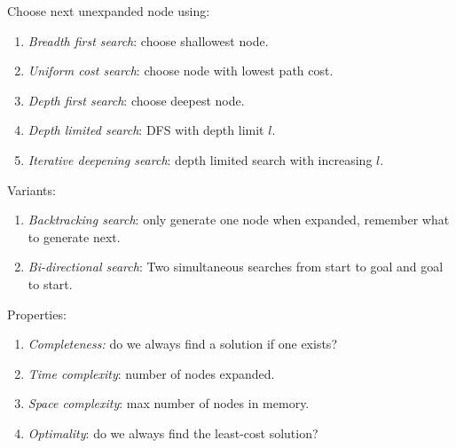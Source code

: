\documentclass[twocolumn,english]{article}
\begin{document}
Choose next unexpanded node using:
\begin{enumerate}
\item \emph{Breadth first search}: choose shallowest node.
\item \emph{Uniform cost search}: choose node with lowest path cost.
\item \emph{Depth first search}: choose deepest node.
\item \emph{Depth limited search}: DFS with depth limit $l$.
\item \emph{Iterative deepening search}: depth limited search with increasing
$l$.
\end{enumerate}
Variants:
\begin{enumerate}
\item \emph{Backtracking search}: only generate one node when expanded,
remember what to generate next.
\item \emph{Bi-directional search}: Two simultaneous searches from start
to goal and goal to start.
\end{enumerate}
Properties:
\begin{enumerate}
\item \emph{Completeness:} do we always find a solution if one exists?
\item \emph{Time complexity}: number of nodes expanded.
\item \emph{Space complexity}: max number of nodes in memory.
\item \emph{Optimality}: do we always find the least-cost solution?
\end{enumerate}
\end{document}
